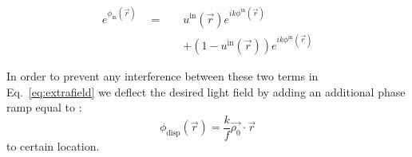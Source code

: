 \begin{subequations}
\label{eq:extrafield}
\begin{align}
e^{\phi _{\mathrm{in}}(\vec{r})} \quad = \quad & u^{\mathrm{in}}(\vec{r}) e^{ik\phi ^{\mathrm{in}}(\vec{r})} \\
											&  + \left( 1- u^{\mathrm{in}}(\vec{r})\right) e^{ik\phi ^{\mathrm{in}}(\vec{r})}
\end{align}
\end{subequations} 

In order to prevent any interference between these two terms in Eq.~\eqref{eq:extrafield} we deflect the desired light field by adding an additional phase ramp \cite{CURTIS2002169} equal to :
\begin{equation}
\phi _{\mathrm{disp}}(\vec{r}) = \frac{k}{f}\vec{\rho _{0}}\cdot \vec{r}
\end{equation}
to certain location.
